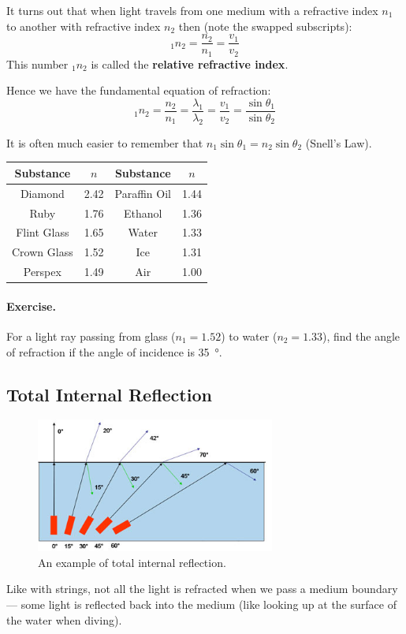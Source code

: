 \documentclass[a4paper]{amsbook}
\newcommand\capcite[1]{}
\begin{document}
It turns out that when light travels from one medium with a refractive index $ n_1 $
to another with refractive index $ n_2 $ then (note the swapped subscripts):
\begin{displaymath}
  _1 n_2 = \frac{n_2}{n_1} = \frac{v_1}{v_2}
\end{displaymath}
This number $ _1 n _2 $ is called the \textbf{relative refractive index}.

Hence we have the fundamental equation of refraction:
\begin{equation}
  _1 n _2 = \frac{n_2}{n_1} = \frac{\lambda_1}{\lambda_2} = \frac{v_1}{v_2} = \frac{\sin \theta_1}{\sin \theta_2}
\end{equation}

It is often much easier to remember that $ n_1 \sin \theta_1 = n_2 \sin \theta_2 $ (Snell's Law).

\begin{center}
\begin{tabular}{c|c||c|c}
  \textbf{Substance} & $ n $ & \textbf{Substance} & $ n $\\\hline
  Diamond & 2.42 & Paraffin Oil & 1.44\\
  Ruby & 1.76 & Ethanol & 1.36\\
  Flint Glass & 1.65 & Water & 1.33\\
  Crown Glass & 1.52 & Ice & 1.31\\
  Perspex & 1.49 & Air & 1.00
\end{tabular}
\end{center}

\paragraph{Exercise.} For a light ray passing from glass ($ n_1 = 1.52 $) to water ($ n_2 = 1.33 $), find the angle
of refraction if the angle of incidence is \SI{35}{\degree}.

\subsection{Total Internal Reflection}
\begin{figure}
  \centering
  \includegraphics[width=0.7\textwidth]{criticalangle}
  \caption{An example of total internal reflection. \capcite{http://www.timbercon.com/assets/Uploads/fiber-optic-glossary/images/Critical-Angle.jpg}\label{fig:tire}}
\end{figure}
Like with strings, not all the light is refracted when we pass a medium boundary --- some light is reflected back into
the medium (like looking up at the surface of the water when diving).
\end{document}
